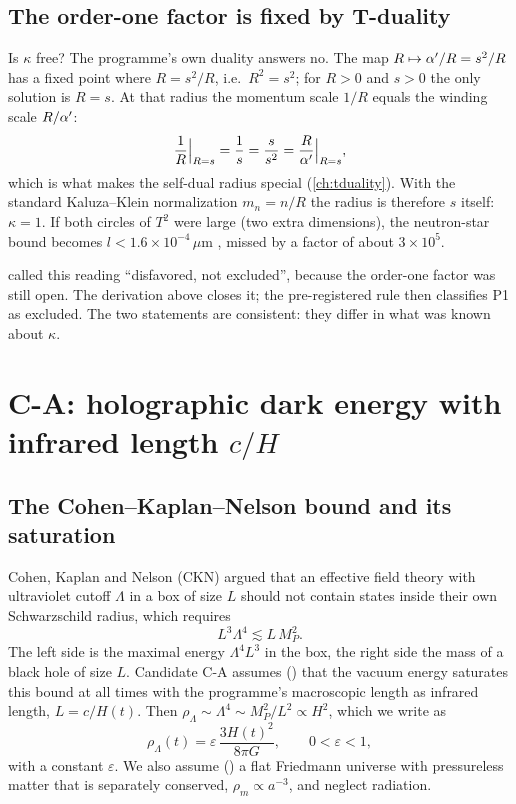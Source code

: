 \subsection{The order-one factor is fixed by T-duality}

Is $\kappa$ free? The programme's own duality answers no. The map $R\mapsto\alpha'/R=s^2/R$ has a
fixed point where $R=s^2/R$, i.e.\ $R^2=s^2$; for $R>0$ and $s>0$ the only solution is $R=s$.
At that radius the momentum scale $1/R$ equals the winding scale $R/\alpha'$:
\[
 \frac1R\Big|_{R=s}=\frac1s=\frac{s}{s^2}=\frac{R}{\alpha'}\Big|_{R=s},
\]
which is what makes the self-dual radius special (\cref{ch:tduality}). With the standard
Kaluza--Klein normalization $m_n=n/R$ the radius is therefore $s$ itself: $\kappa=1$. If both
circles of $T^2$ were large (two extra dimensions), the neutron-star bound becomes
$l<1.6\times10^{-4}\,\mu$m , missed by a factor of about $3\times10^5$.

\begin{remark}
 called this reading ``disfavored, not excluded'', because the order-one
factor was still open. The derivation above closes it; the pre-registered rule then classifies
P1 as excluded. The two statements are consistent: they differ in what was known about
$\kappa$.
\end{remark}

\section{C-A: holographic dark energy with infrared length \texorpdfstring{$c/H$}{c/H}}\label{sec:verdicts:ca}

\subsection{The Cohen--Kaplan--Nelson bound and its saturation}

Cohen, Kaplan and Nelson (CKN) argued that an effective field theory with ultraviolet cutoff
$\Lambda$ in a box of size $L$ should not contain states inside their own Schwarzschild radius,
which requires 
\begin{equation}\label{eq:verdicts:ckn}
 L^3\Lambda^4\lesssim L\,M_P^2 .
\end{equation}
The left side is the maximal energy $\Lambda^4L^3$ in the box, the right side the mass of a black
hole of size $L$. Candidate C-A assumes (\TC) that the vacuum energy saturates this bound at all
times with the programme's macroscopic length as infrared length, $L=c/H(t)$. Then
$\rho_\Lambda\sim\Lambda^4\sim M_P^2/L^2\propto H^2$, which we write as
\begin{equation}\label{eq:verdicts:rhoL}
 \rho_\Lambda(t)=\varepsilon\,\frac{3H(t)^2}{8\pi G},\qquad 0<\varepsilon<1,
\end{equation}
with a constant $\varepsilon$. We also assume (\TC) a flat Friedmann universe with pressureless
matter that is separately conserved, $\rho_m\propto a^{-3}$, and neglect radiation.

